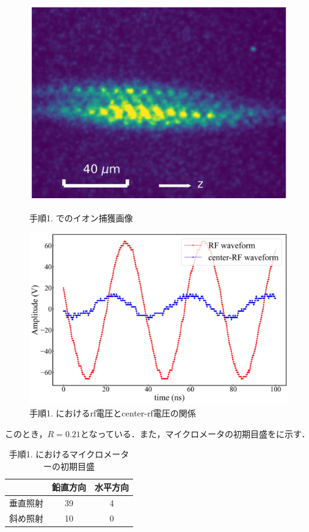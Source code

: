 \begin{enumerate}
\begin{figure}[h]
	\begin{minipage}{0.48\linewidth}
	\begin{center}
		\includegraphics[width = 0.6\columnwidth]{./methods/figure/1_2D.jpg}
		\caption{手順1. でのイオン捕獲画像}
		\label{fig:1_2D}
	\end{center}
	\end{minipage}
	\begin{minipage}{0.48\linewidth}
		\begin{center}
			\includegraphics[width = 0.9\columnwidth]{./methods/figure/1_2D_wave.jpg}
			\caption{手順1. におけるrf電圧とcenter-rf電圧の関係}
			\label{fig:1_2D_wave}
		\end{center}
	\end{minipage}
\end{figure}

このとき，$R=0.21$となっている．また，マイクロメータの初期目盛をに示す．

\begin{table}[h]
	\begin{center}
	\caption{手順1. におけるマイクロメーターの初期目盛}
	\label{tab:1_2D}
	\begin{tabular}{c|cc} \hline \hline
		&鉛直方向&水平方向 \\ \hline
		垂直照射&39 &4 \\ 
		斜め照射&10&0 \\ \hline
	\end{tabular}
	\end{center}
\end{table}


\end{enumerate}
